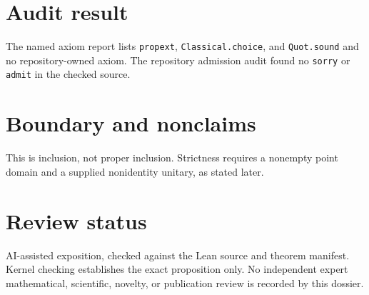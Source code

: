 \documentclass[11pt]{article}
\begin{document}
\section{Audit result}
The named axiom report lists \texttt{propext}, \texttt{Classical.choice}, and
\texttt{Quot.sound} and no repository-owned axiom.  The repository admission audit found no
\texttt{sorry} or \texttt{admit} in the checked source.

\section{Boundary and nonclaims}
This is inclusion, not proper inclusion.  Strictness requires a nonempty point domain and a supplied nonidentity unitary, as stated later.

\section{Review status}
AI-assisted exposition, checked against the Lean source and theorem manifest.  Kernel checking
establishes the exact proposition only.  No independent expert mathematical, scientific,
novelty, or publication review is recorded by this dossier.
\end{document}
